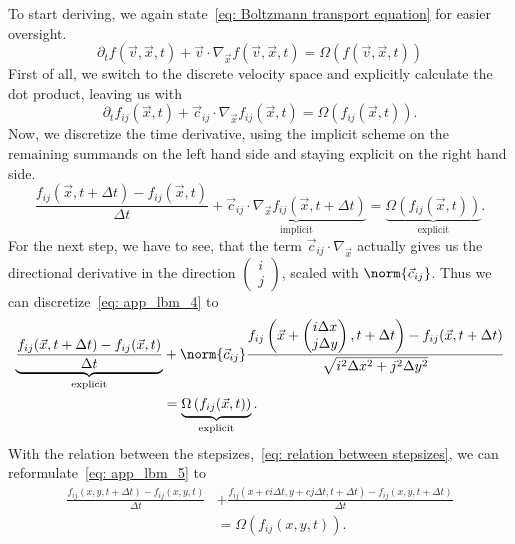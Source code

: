 To start deriving, we again state~\eqref{eq: Boltzmann transport equation} for easier oversight.
\begin{equation}
  \label{eq: app_lbm_2}
  \partial_t f(\vec{v},\vec{x},t) + \vec{v} \cdot \nabla_{\vec{x}} f(\vec{v},\vec{x},t) = \Omega\left(f(\vec{v},\vec{x},t)\right)
\end{equation}
First of all, we switch to the discrete velocity space and explicitly calculate the dot product, leaving us with
\begin{equation}
  \label{eq: app_lbm_3}
  \partial_t f_{ij}(\vec{x},t) + \vec{c}_{ij} \cdot \nabla_{\vec{x}} f_{ij}(\vec{x},t) = \Omega\left(f_{ij}(\vec{x},t)\right).
\end{equation}
Now, we discretize the time derivative, using the implicit scheme on the remaining summands on the left hand side and staying explicit on the right hand side.
\begin{equation}
  \label{eq: app_lbm_4}
  \frac{f_{ij}(\vec{x}, t+\Delta t) - f_{ij}(\vec{x}, t)}{\Delta t}
  +
  \underbrace {\vec{c}_{ij} \cdot \nabla_{\vec{x}} f_{ij}(\vec{x},t+\Delta t)
  }_{\text{implicit}}
   = \underbrace{\Omega\left(f_{ij}(\vec{x},t)\right)}_{\text{explicit}}.
\end{equation}
For the next step, we have to see, that the term $\vec{c}_{ij} \cdot \nabla_{\vec{x}}$ actually gives us the directional derivative in the direction $\begin{pmatrix}i\\j\end{pmatrix}$, scaled with $\norm{\vec{c}_{ij}}$.
Thus we can discretize~\eqref{eq: app_lbm_4} to
\begin{equation}
  \label{eq: app_lbm_5}
  \begin{aligned}
    \underbrace{\frac{f_{ij}(\vec{x}, t+\Delta t) - f_{ij}(\vec{x}, t)}{\Delta t}}_{\text{explicit}}
    & + \norm{\vec{c}_{ij}}\frac{f_{ij}\left(\vec{x}+\begin{pmatrix}i\Delta x\\j\Delta y\end{pmatrix}, t+\Delta t\right) - f_{ij}(\vec{x}, t+\Delta t)}{\sqrt{i^2\Delta x^2 + j^2\Delta y^2}}
    \\&
    = \underbrace{\Omega\left(f_{ij}(\vec{x},t)\right)}_{\text{explicit}}.
  \end{aligned}
\end{equation}
With the relation between the stepsizes,~\eqref{eq: relation between stepsizes}, we can reformulate~\eqref{eq: app_lbm_5} to
\begin{equation}
  \label{eq: app_lbm_6}
  \begin{aligned}
    \frac{f_{ij}(x,y, t+\Delta t) - f_{ij}(x,y, t)}{\Delta t}
    & + \frac{f_{ij}\left(x + ci\Delta t, y+ cj\Delta t, t+\Delta t\right) - f_{ij}(x,y, t+\Delta t)}{\Delta t}
    \\&
    = \Omega\left(f_{ij}(x,y,t)\right).
  \end{aligned} 
\end{equation}
